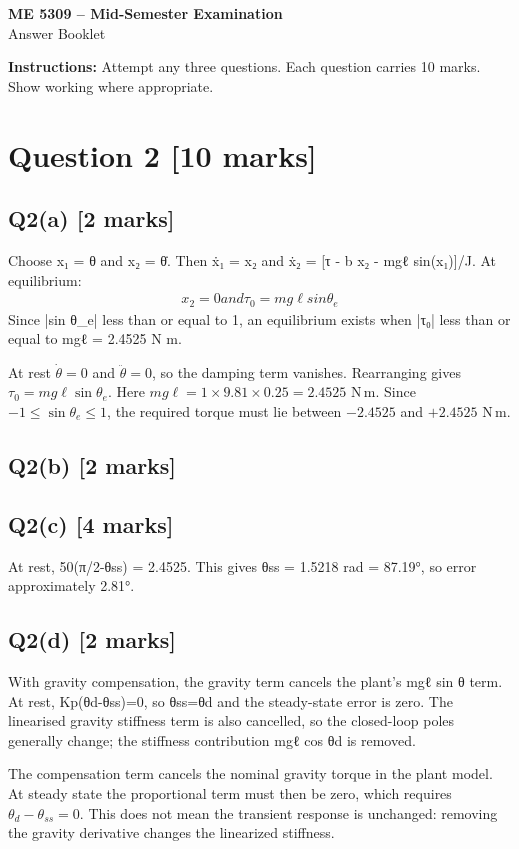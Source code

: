 \documentclass[11pt,a4paper]{article}
\begin{document}
\begin{center}
{\Large\bfseries ME 5309 -- Mid-Semester Examination}\\[3pt]
{\large Answer Booklet}\\[8pt]
\end{center}
\textbf{Instructions:} Attempt any three questions. Each question carries 10 marks. Show working where appropriate.
\section*{Question 2 \hfill [10 marks]}
\subsection*{Q2(a) \hfill [2 marks]}

Choose x₁ = θ and x₂ = θ̇.
Then ẋ₁ = x₂ and ẋ₂ = [τ - b x₂ - mgℓ sin(x₁)]/J.
At equilibrium:\[\begin{aligned}x_2 = 0 and τ_0 = mg\ell sin \theta_e\end{aligned}\]
Since |sin θ\_e| less than or equal to 1, an equilibrium exists when |τ₀| less than or equal to mgℓ = 2.4525 N m.\par\smallskip At rest $\dot\theta=0$ and $\ddot\theta=0$, so the damping term vanishes. Rearranging gives $\tau_0=mg\ell\sin\theta_e$. Here $mg\ell=1\times9.81\times0.25=2.4525$ N\,m. Since $-1\leq\sin\theta_e\leq1$, the required torque must lie between $-2.4525$ and $+2.4525$ N\,m.

\subsection*{Q2(b) \hfill [2 marks]}

\vspace{2mm}

\subsection*{Q2(c) \hfill [4 marks]}

At rest, 50(π/2-θss) = 2.4525.
This gives θss = 1.5218 rad = 87.19°, so error approximately 2.81°.

\subsection*{Q2(d) \hfill [2 marks]}

With gravity compensation, the gravity term cancels the plant's mgℓ sin θ term.
At rest, Kp(θd-θss)=0, so θss=θd and the steady-state error is zero.
The linearised gravity stiffness term is also cancelled, so the closed-loop poles generally change; the stiffness contribution mgℓ cos θd is removed.\par\smallskip The compensation term cancels the nominal gravity torque in the plant model. At steady state the proportional term must then be zero, which requires $\theta_d-\theta_{ss}=0$. This does not mean the transient response is unchanged: removing the gravity derivative changes the linearized stiffness.
\end{document}

